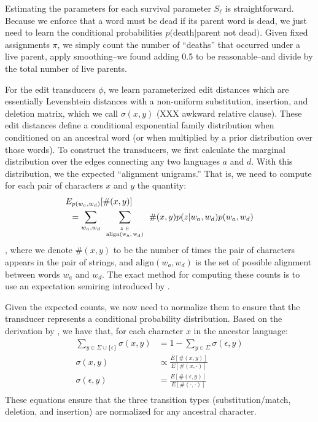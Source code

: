 \documentclass[11pt,a4paper]{article}
\begin{document}
Estimating the parameters for each survival parameter $S_\ell$ is
straightforward. Because we enforce that a word must be dead if its
parent word is dead, we just need to learn the conditional probabilities
$p($death$|$parent not dead$)$. Given fixed assignments $\pi$, we
simply count the number of ``deaths'' that occurred under a live
parent, apply smoothing--we found adding 0.5 to be reasonable--and
divide by the total number of live parents.

For the edit transducers $\phi$, we learn parameterized edit distances
which are essentially Levenshtein distances with a non-uniform
substitution, insertion, and deletion matrix, which we call
$\sigma(x,y)$ (XXX awkward relative clause). These edit distances
define a conditional exponential family distribution when conditioned
on an ancestral word (or when multiplied by a prior distribution
over those words). To construct the transducers, we first calculate
the marginal distribution over the edges connecting any two languages
$a$ and $d$. With this distribution, we the expected
``alignment unigrams.'' That is, we
need to compute for each pair of characters $x$ and $y$ the quantity:
\begin{equation}
  \begin{split}
    E_{p(w_a,w_d)}&[\#(x,y)] \\ = \sum_{w_a,w_d} &\sum_{\tiny\begin{array}{c} z\in \\ \mathrm{align(w_a,w_d)} \end{array}} \#(x,y) p(z|w_a,w_d)p(w_a,w_d)
   \end{split}
 \end{equation}
, where we denote $\#(x,y)$ to be the number of times the pair of characters
appears in the pair of strings, and $\mathrm{align}(w_a,w_d)$ is the set of possible
alignment between words $w_a$ and $w_d$. The exact method for computing
these counts is to use an expectation semiring introduced by
.

Given the expected counts, we now need to normalize them to ensure
that the transducer represents a conditional probability distribution.
Based on the derivation by  , we have that,
for each character $x$ in the ancestor language:
\begin{equation}
  \begin{split}
    \sum_{y \in \Sigma \cup \{\epsilon\}} \sigma(x,y) &= 1 - \sum_{y \in \Sigma} \sigma(\epsilon,y) \\
    \sigma(x,y) &\propto \frac{E[\#(x,y)]}{E[\#(x,\cdot)]} \\
    \sigma(\epsilon,y) &= \frac{E[\#(\epsilon,y)]}{E[\#(\cdot,\cdot)]} \\
   \end{split}
 \end{equation}
These equations ensure that the three transition
types (substitution/match, deletion, and insertion) are normalized for
any ancestral character.
\end{document}
